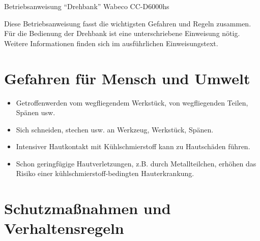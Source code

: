 \documentclass[fontsize=9pt]{scrartcl}
\newenvironment{smallitemize}{\begin{itemize}\itemsep -3pt}{\end{itemize}}
\begin{document}

\begin{center}
	\LARGE{Betriebsanweisung \enquote{Drehbank} Wabeco CC-D6000hs}
\end{center}


\begin{center}
	Diese Betriebsanweisung fasst die wichtigsten Gefahren und Regeln zusammen.\\
	Für die Bedienung der Drehbank ist eine unterschriebene Einweisung nötig.\\
	Weitere Informationen finden sich im ausführlichen Einweisungstext.\\
\end{center}

\section{Gefahren für Mensch und Umwelt}

\begin{smallitemize}
	\item Getroffenwerden vom wegfliegendem Werkstück, von wegfliegenden Teilen, Spänen usw.
	\item Sich schneiden, stechen usw. an Werkzeug, Werkstück, Spänen.
	\item Intensiver Hautkontakt mit Kühlschmierstoff kann zu Hautschäden führen.
	\item Schon geringfügige Hautverletzungen, z.B. durch Metallteilchen, erhöhen das Risiko einer kühlschmierstoff-bedingten Hauterkrankung.
\end{smallitemize}

\section{Schutzmaßnahmen und Verhaltensregeln}
\end{document}
